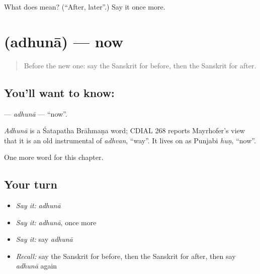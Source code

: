 \begin{tcolorbox}[breakable,colback=teal!4,colframe=teal!35!black,title={Before you move on}]
What does  mean? (\textquotedblleft{}After, later\textquotedblright{}.) Say it once more.
\end{tcolorbox}
\section[\texorpdfstring{\sk{अधुना} (adhunā)}{अधुना (adhunā)}]{ (adhunā) — now}

\label{lesson:SA-C92-adhuna}



\begin{quote}
Before the new one: say the Sanskrit for before, then the Sanskrit for after.
\end{quote}

\subsection*{You'll want to know: }
\textbf{} — \emph{adhunā} — \textquotedblleft{}now\textquotedblright{}.

\begin{cousinweb}
\emph{Adhunā} is a Śatapatha Brāhmaṇa word; CDIAL 268 reports Mayrhofer's view that it is an old instrumental of \emph{adhvan}, \textquotedblleft{}way\textquotedblright{}. It lives on as Punjabi \emph{huṇ}, \textquotedblleft{}now\textquotedblright{}.
\end{cousinweb}

\begin{grammarlens}[title={What you've built}]
One more word for this chapter.
\end{grammarlens}

\subsection*{Your turn}
\begin{itemize}
\raggedright
  \item \emph{Say it:} \emph{adhunā}
  \item \emph{Say it:} \emph{adhunā}, once more
  \item \emph{Say it:} say \emph{adhunā}
  \item \emph{Recall:} say the Sanskrit for before, then the Sanskrit for after, then say \emph{adhunā} again
\end{itemize}

